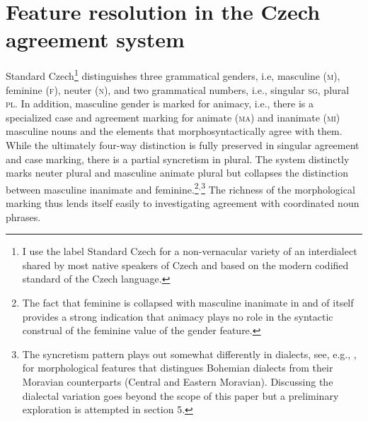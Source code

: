 \documentclass[output=paper,
modfonts
newtxmath,
hidelinks
]{langscibook}
\begin{document}
\section{Feature resolution in the Czech agreement system}
\label{sec:featureResolution}

Standard Czech\footnote{I use the label Standard Czech for a non-vernacular variety of an interdialect shared by most native speakers of Czech and based on the modern codified standard of the Czech language.} distinguishes three grammatical genders, i.e, masculine (\textsc{m}), feminine (\textsc{f}), neuter (\textsc{n}), and two grammatical numbers, i.e., singular \textsc{sg}, plural \textsc{pl}. In addition, masculine gender is marked for animacy, i.e., there is a specialized case and agreement marking for animate (\textsc{ma}) and inanimate (\textsc{mi}) masculine nouns and the elements that morphosyntactically agree with them. While the ultimately four-way distinction is fully preserved in singular agreement and case marking, there is a partial syncretism in plural. The system distinctly marks neuter plural and masculine animate plural but collapses the distinction between masculine inanimate and feminine.\footnote{The fact that feminine is collapsed with masculine inanimate in and of itself provides a strong indication that animacy plays no role in the syntactic construal of the feminine value of the gender feature.}$^,$\footnote{The syncretism pattern plays out somewhat differently in dialects, see, e.g., \citet[392--404]{KarlikEtAl:2002}, for morphological features that distingues Bohemian dialects from their Moravian counterparts (Central and Eastern Moravian). Discussing the dialectal variation goes beyond the scope of this paper but a preliminary exploration is attempted in section 5.} The richness of the morphological marking thus lends itself easily to investigating agreement with coordinated noun phrases.
\end{document}
